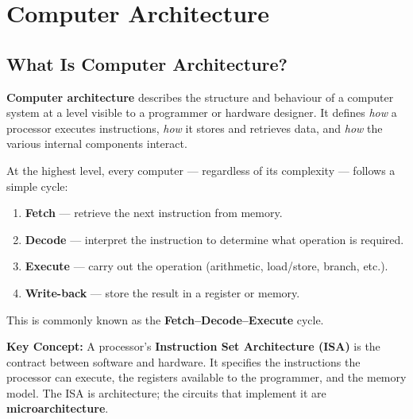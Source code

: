 \documentclass[12pt, a4paper, oneside]{book}
\begin{document}
\tableofcontents
\newpage

\chapter{Computer Architecture}

\section{What Is Computer Architecture?}

\textbf{Computer architecture} describes the structure and behaviour of a computer system at a level visible to a programmer or hardware designer. It defines \textit{how} a processor executes instructions, \textit{how} it stores and retrieves data, and \textit{how} the various internal components interact.

At the highest level, every computer --- regardless of its complexity --- follows a simple cycle:

\begin{enumerate}
  \item \textbf{\color{purple}Fetch} --- retrieve the next instruction from memory.
  \item \textbf{\color{purple}Decode} --- interpret the instruction to determine what operation is required.
  \item \textbf{\color{purple}Execute} --- carry out the operation (arithmetic, load/store, branch, etc.).
  \item \textbf{\color{purple}Write-back} --- store the result in a register or memory.
\end{enumerate}

This is commonly known as the \textbf{Fetch--Decode--Execute} cycle.

\begin{keybox}
\textbf{\color{gold}Key Concept:}
A processor's \textbf{Instruction Set Architecture (ISA)} is the contract between software and hardware. It specifies the instructions the processor can execute, the registers available to the programmer, and the memory model. The ISA is architecture; the circuits that implement it are \textbf{microarchitecture}.
\end{keybox}
\end{document}
